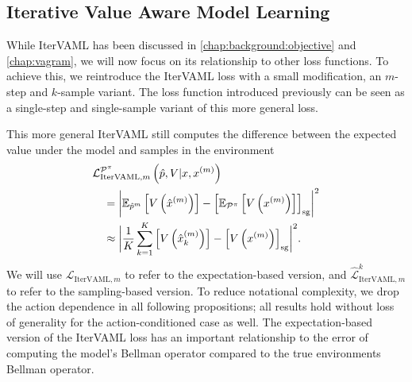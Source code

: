 \subsection{Iterative Value Aware Model Learning}

While IterVAML has been discussed in \autoref{chap:background:objective} and \autoref{chap:vagram}, we will now focus on its relationship to other loss functions.
To achieve this, we reintroduce the IterVAML loss with a small modification, an $m$-step and $k$-sample variant.
The loss function introduced previously can be seen as a single-step and single-sample variant of this more general loss.

This more general IterVAML still computes the difference between the expected value under the model and samples in the environment
\begin{equation}\label{eq:cvaml:itervaml}
\begin{aligned}
     &{\mathcal{L}}^{\mathcal{P}^\pi}_{\mathrm{IterVAML}, m}\left(\hat{p},V|x, x^{(m)}\right) \\
    & \quad = \biggl|\mathbb{E}_{\hat{p}^m} \left[ V\left( \hat{x}^{(m)} \right) \right] - 
    \left[ \mathbb{E}_{\mathcal{P}^\pi}\left[  V\left( x^{(m)} \right) \right] \right]_\mathrm{sg}\biggr|^2 \\
    & \quad \approx \biggl|\frac{1}{K}\sum_{k=1}^K \left[ V\left( \hat{x}_k^{(m)} \right) \right] - 
    \left[ V\left( x^{(m)} \right) \right]_\mathrm{sg}\biggr|^2. 
\end{aligned}
\end{equation}
%
We will use $\mathcal{L}_{\mathrm{IterVAML}, m}$ to refer to the expectation-based version, and $\hat{\mathcal{L}}^k_{\mathrm{IterVAML}, m}$ to refer to the sampling-based version.
To reduce notational complexity, we drop the action dependence in all following propositions; all results hold without loss of generality for the action-conditioned case as well.
The expectation-based version of the IterVAML loss has an important relationship to the error of computing the model's Bellman operator compared to the true environments Bellman operator.

